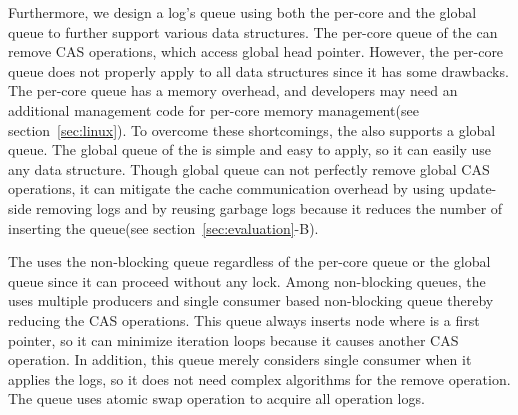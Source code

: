 Furthermore, we design a log's queue using both the per-core and the global queue
to further support various data structures.
The per-core queue of the \LDU can remove CAS operations, which access global
head pointer. 
However, the per-core queue does not properly apply to all data structures since
it has some drawbacks.
The per-core queue has a memory overhead, and developers may need
an additional management code for per-core memory management(see section~\ref{sec:linux}).
To overcome these shortcomings, the \LDU also supports a global queue.
The global queue of the \LDU is simple and easy to apply, so it can easily use any
data structure.
Though global queue can not perfectly remove global CAS operations, it can
mitigate the cache communication overhead by using update-side removing
logs and by reusing garbage logs because it reduces the number of inserting the
queue(see section~\ref{sec:evaluation}-B).

The \LDU uses the non-blocking queue regardless of the per-core queue or the
global queue since it can proceed without any lock.
Among non-blocking queues, the \LDU uses multiple producers and single consumer
based non-blocking queue thereby reducing the CAS operations.
This queue always inserts node where is a first pointer, so it can minimize
iteration loops because it causes another CAS operation.
In addition, this queue merely considers single consumer when it applies
the logs, so it does not need complex algorithms for the remove operation.
The queue uses atomic swap operation to acquire all operation logs.

